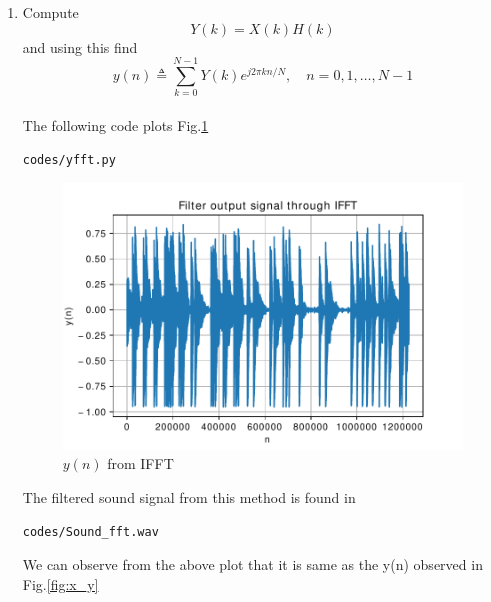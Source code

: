 \documentclass[journal,12pt,twocolumn]{IEEEtran}
\renewcommand\thesection{\arabic{section}}
\begin{document}
\begin{enumerate}[label=\thesection.\arabic*
,ref=\thesection.\theenumi]
\item Compute
\begin{equation}
Y(k) = X(k)H(k)
\end{equation}
and using this find 
\begin{equation}
y(n) \triangleq \sum_{k=0}^{N-1} Y(k) e^{j 2 \pi k n / N}, \quad n=0,1, \ldots, N-1
\end{equation}
\\
\solution
The following code plots Fig.\ref{fig:yfft}
\begin{lstlisting}
codes/yfft.py
\end{lstlisting}
\begin{figure}[!ht]
\centering
\includegraphics[width=\columnwidth]{./figs/yfft}
\caption{$y(n)$ from IFFT}
\label{fig:yfft}
\end{figure}

The filtered sound signal from this method is found in
\begin{lstlisting}
codes/Sound_fft.wav
\end{lstlisting}
We can observe from the above plot that it is same as the y(n) observed in Fig.\ref{fig:x_y}
\end{enumerate}
\end{document}
